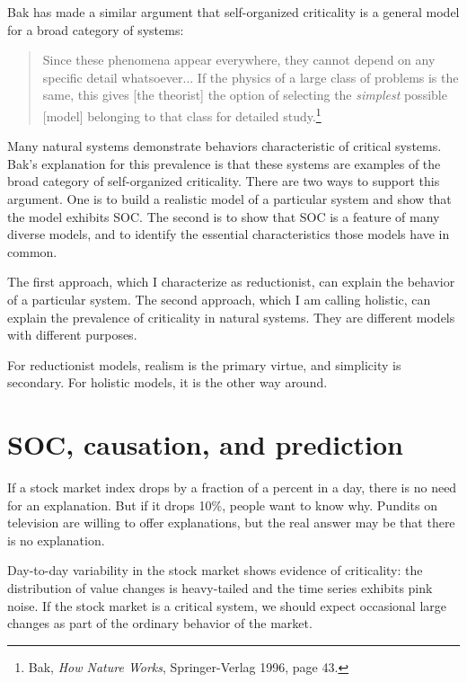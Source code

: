 \documentclass[12pt]{book}
\theoremstyle{exercise}
\begin{document}

Bak has made a similar argument that self-organized criticality is a
general model for a broad category of systems:

\begin{quote}
Since these phenomena appear everywhere, they cannot depend on any
specific detail whatsoever...  If the physics of a large class of
problems is the same, this gives [the theorist] the option of selecting
the {\em simplest} possible [model] belonging to that class for detailed
study.\footnote{Bak, {\em How Nature Works}, Springer-Verlag 1996, page 43.}
\end{quote}


Many natural systems demonstrate behaviors characteristic of critical
systems.  Bak's explanation for this prevalence is that these systems
are examples of the broad category of self-organized criticality.
There are two ways to support this argument.  One is to build
a realistic model of a particular system and show that the model
exhibits SOC.  The second is to show that SOC is a feature of many
diverse models, and to identify the essential characteristics
those models have in common.


The first approach, which I characterize as reductionist, can explain
the behavior of a particular system.  The second approach, which I am calling holistic, can explain the prevalence of criticality in natural systems.  They are different models with different purposes.


For reductionist models, realism is the primary virtue, and simplicity
is secondary.  For holistic models, it is the other way around.


\section{SOC, causation, and prediction}

If a stock market index drops by a fraction of a percent in a
day, there is no need for an explanation.  But if it drops 10\%,
people want to know why.  Pundits
on television are willing to offer explanations, but the real
answer may be that there is no explanation.


Day-to-day variability in the stock market shows evidence of
criticality: the distribution of value changes is heavy-tailed
and the time series exhibits pink noise.
If the stock market is a critical system, we
should expect occasional large changes as part of the ordinary
behavior of the market.
\end{document}
